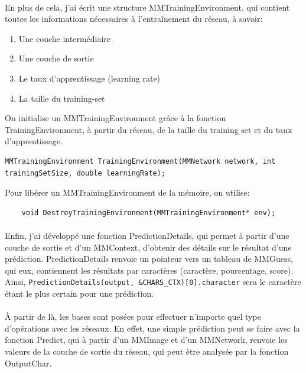 \documentclass{article}
\begin{document}
\paragraph{}En plus de cela, j’ai écrit une structure MMTrainingEnvironment, qui contient toutes les informations nécessaires à l’entraînement du réseau, à savoir:
\begin{enumerate}
	\item Une couche intermédiaire
	\item Une couche de sortie
	\item Le taux d’apprentissage (learning rate)
	\item La taille du training-set
\end{enumerate}

On initialise un MMTrainingEnvironment grâce à la fonction TrainingEnvironment, à partir du réseau, de la taille du training set et du taux d’apprentissage.

\begin{lstlisting}
MMTrainingEnvironment TrainingEnvironment(MMNetwork network, int trainingSetSize, double learningRate);		
\end{lstlisting}
Pour libérer un MMTrainingEnvironment de la mémoire, on utilise:
\begin{lstlisting}
	void DestroyTrainingEnvironment(MMTrainingEnvironment* env);

\end{lstlisting}


\paragraph{}
Enfin, j’ai développé une fonction PredictionDetails, qui permet à partir d’une couche de sortie et d’un MMContext, d’obtenir des détails sur le résultat d’une prédiction. \newline
PredictionDetails renvoie un pointeur vers un tableau de MMGuess, qui eux, contiennent les résultats par caractères (caractère, pourcentage, score).\newline
Ainsi, \texttt{PredictionDetails(output, \&CHARS\_CTX)[0].character} sera le caractère étant le plus certain pour une prédiction.

\paragraph{}
À partir de là, les bases sont posées pour effectuer n'importe quel type d'opérations avec les réseaux. En effet, une simple prédiction peut se faire avec la fonction Predict, qui à partir d'un MMImage et d'un MMNetwork, renvoie les valeurs de la couche de sortie du réseau, qui peut être analysée par la fonction OutputChar.
\end{document}
